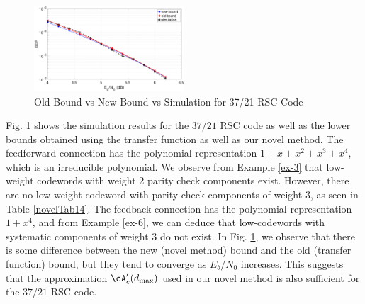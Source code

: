 \begin{figure}[htbp]
\centering
		\includegraphics[width=0.5\textwidth]{./Images/RSC_37_21_lower_weights.eps}
		\caption{Old Bound vs New Bound vs Simulation for 37/21 RSC Code}
		\label{simFig2}
		\end{figure}
Fig. \ref{simFig2} shows the simulation results for the $37/21$ RSC code as well as the lower bounds obtained using the transfer function as well as our novel method. The feedforward connection has the polynomial representation $1+x+x^2+x^3+x^4$, which is an irreducible polynomial. We observe from Example \ref{ex-3} that low-weight codewords with weight 2 parity check components exist. However, there are no low-weight codeword with parity check components of weight $3$, as seen in  Table \ref{novelTab14}. The feedback connection has the polynomial representation $1+x^4$, and from Example \ref{ex-6}, we can deduce that low-codewords with systematic components of weight $3$ do not exist. In Fig. \ref{simFig2}, we observe that there is some difference between the new (novel method) bound and the old (transfer function) bound, but they tend to converge as $E_b/N_0$ increases. This suggests that the approximation $\cA'_c(d_{\text{max}})$ used in our novel method is also sufficient for the $37/21$ RSC code.

